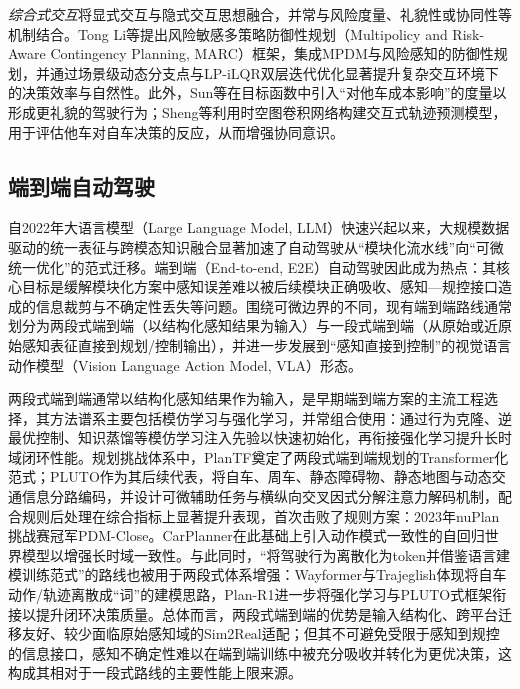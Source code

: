     \emph{综合式交互}将显式交互与隐式交互思想融合，并常与风险度量、礼貌性或协同性等机制结合。Tong Li等\cite{li2023marc}提出风险敏感多策略防御性规划（Multipolicy and Risk-Aware Contingency Planning, MARC）框架，集成MPDM与风险感知的防御性规划，并通过场景级动态分支点与LP-iLQR双层迭代优化显著提升复杂交互环境下的决策效率与自然性。此外，Sun等\cite{sun2018courteous}在目标函数中引入“对他车成本影响”的度量以形成更礼貌的驾驶行为；Sheng等\cite{sheng2023cooperationaware}利用时空图卷积网络构建交互式轨迹预测模型，用于评估他车对自车决策的反应，从而增强协同意识。


  \subsection{端到端自动驾驶}
    \label{sub:end2end}
    自2022年大语言模型（Large Language Model, LLM）快速兴起以来\cite{AttnIsAllYouNeed2017}，大规模数据驱动的统一表征与跨模态知识融合显著加速了自动驾驶从“模块化流水线”向“可微统一优化”的范式迁移。端到端（End-to-end, E2E）自动驾驶因此成为热点：其核心目标是缓解模块化方案中感知误差难以被后续模块正确吸收、感知—规控接口造成的信息裁剪与不确定性丢失等问题。围绕可微边界的不同，现有端到端路线通常划分为两段式端到端（以结构化感知结果为输入）与一段式端到端（从原始或近原始感知表征直接到规划/控制输出），并进一步发展到“感知直接到控制”的视觉语言动作模型（Vision Language Action Model, VLA）形态。

    两段式端到端通常以结构化感知结果作为输入，是早期端到端方案的主流工程选择，其方法谱系主要包括模仿学习与强化学习，并常组合使用：通过行为克隆、逆最优控制、知识蒸馏等模仿学习\cite{chen2023endtoend}注入先验以快速初始化，再衔接强化学习提升长时域闭环性能。规划挑战体系中，PlanTF\cite{PlanTF2023}奠定了两段式端到端规划的Transformer化范式；PLUTO\cite{PLUTO2024}作为其后续代表，将自车、周车、静态障碍物、静态地图与动态交通信息分路编码，并设计可微辅助任务与横纵向交叉因式分解注意力解码机制，配合规则后处理在综合指标上显著提升表现，首次击败了规则方案：2023年nuPlan挑战赛冠军PDM-Close。CarPlanner\cite{CarPlanner2025}在此基础上引入动作模式一致性的自回归世界模型以增强长时域一致性。与此同时，“将驾驶行为离散化为token并借鉴语言建模训练范式”的路线也被用于两段式体系增强：Wayformer\cite{Wayformer2022}与Trajeglish\cite{Trajeglish2024}体现将自车动作/轨迹离散成“词”的建模思路，Plan-R1\cite{PlanR12025}进一步将强化学习与PLUTO式框架衔接以提升闭环决策质量。总体而言，两段式端到端的优势是输入结构化、跨平台迁移友好、较少面临原始感知域的Sim2Real适配；但其不可避免受限于感知到规控的信息接口，感知不确定性难以在端到端训练中被充分吸收并转化为更优决策，这构成其相对于一段式路线的主要性能上限来源。

